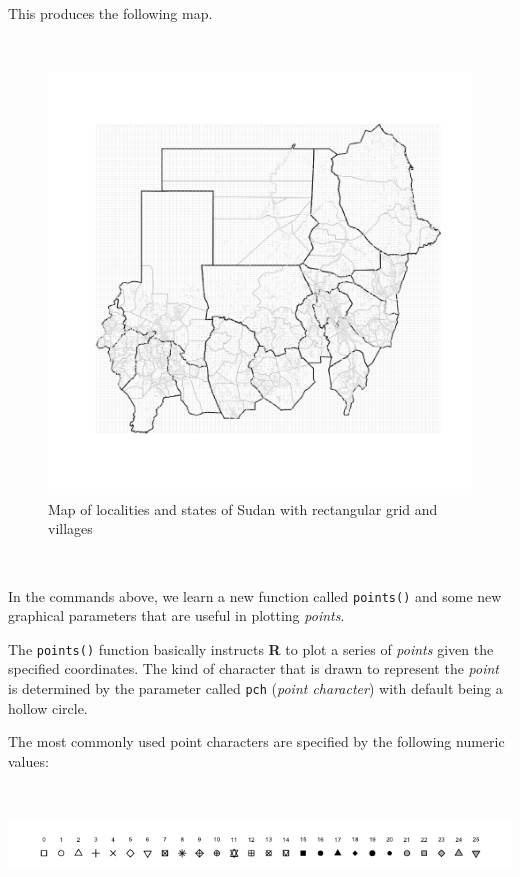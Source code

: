 \documentclass[12pt,a4paper,a4paper]{book}
\theoremstyle{definition}
\theoremstyle{definition}
\theoremstyle{definition}
\theoremstyle{remark}
\begin{document}
This produces the following map.

~

\begin{figure}[H]

{\centering \includegraphics{figures/map5-1} 

}

\caption{Map of localities and states of Sudan with rectangular grid and villages}\label{fig:map5}
\end{figure}

~

In the commands above, we learn a new function called \texttt{points()}
and some new graphical parameters that are useful in plotting
\emph{points}.

The \texttt{points()} function basically instructs \textbf{R} to plot a
series of \emph{points} given the specified coordinates. The kind of
character that is drawn to represent the \emph{point} is determined by
the parameter called \texttt{pch} (\emph{point character}) with default
being a hollow circle.

\newpage

The most commonly used point characters are specified by the following
numeric values:

~

\begin{center}\includegraphics[width=0.9\linewidth]{figures/pch} \end{center}
\end{document}
